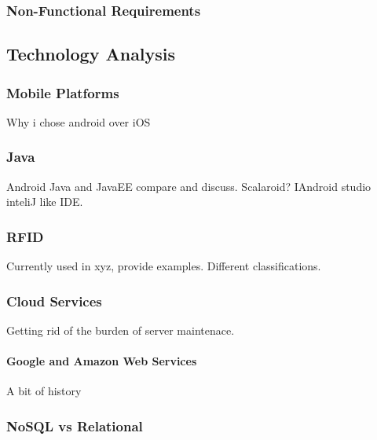 \documentclass[a4paper, 11pt]{article}
\begin{document}
\subsubsection{Non-Functional Requirements}


\subsection{Technology Analysis}
\subsubsection{Mobile Platforms}
Why i chose android over iOS
\subsubsection{Java}
Android Java and JavaEE compare and discuss. Scalaroid? IAndroid studio inteliJ like IDE.
\subsubsection{RFID}
Currently used in xyz, provide examples. Different classifications. 
\subsubsection{Cloud Services} 
Getting rid of the burden of server maintenace. 
\paragraph{Google and Amazon Web Services}
A bit of history


\subsubsection{NoSQL vs Relational}
\end{document}
